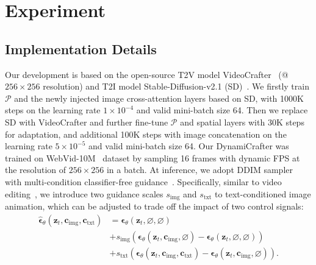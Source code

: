 \section{Experiment}
\label{sec:experiment}

\subsection{Implementation Details}
Our development is based on the open-source T2V model VideoCrafter~\cite{chen2023videocrafter1} (@$256\times 256$ resolution) and T2I model Stable-Diffusion-v2.1 (SD)~\cite{rombach2022high}. We firstly train $\mathcal{P}$ and the newly injected image cross-attention layers based on SD, with 1000K steps on the learning rate $1\times 10^{-4}$ and valid mini-batch size 64. Then we replace SD with VideoCrafter and further fine-tune $\mathcal{P}$ and spatial layers with 30K steps for adaptation, and additional 100K steps with image concatenation on the learning rate $5\times 10^{-5}$ and valid mini-batch size 64. Our DynamiCrafter was trained on WebVid-10M~\cite{bain2021frozen} dataset by sampling 16 frames with dynamic FPS at the resolution of $256\times 256$ in a batch. At inference, we adopt DDIM sampler~\cite{song2021denoising} with multi-condition classifier-free guidance~\cite{ho2022classifier}. Specifically, similar to video editing~\cite{esser2023structure}, we introduce two guidance scales $s_\text{img}$ and $s_\text{txt}$ to text-conditioned image animation, which can be adjusted to trade off the impact of two control signals:
\vspace{-3mm}
\begin{align}
    \nonumber \mathbf{\hat{\epsilon}}_{\theta}\left(\mathbf{z}_t, \mathbf{c}_\text{img}, \mathbf{c}_\text{txt}\right) &=   \mathbf{\epsilon}_{\theta}\left(\mathbf{z}_t, \varnothing, \varnothing\right)\\ \nonumber & +s_\text{img}(\mathbf{\epsilon}_{\theta}\left(\mathbf{z}_t, \mathbf{c}_\text{img}, \varnothing\right)-\mathbf{\epsilon}_{\theta}\left(\mathbf{z}_t, \varnothing, \varnothing\right))\\ \nonumber & +s_\text{txt}(\mathbf{\epsilon}_{\theta}\left(\mathbf{z}_t, \mathbf{c}_\text{img}, \mathbf{c}_\text{txt}\right)-\mathbf{\epsilon}_{\theta}\left(\mathbf{z}_t, \mathbf{c}_\text{img}, \varnothing\right)). 
\end{align}
\vspace{-8mm}


